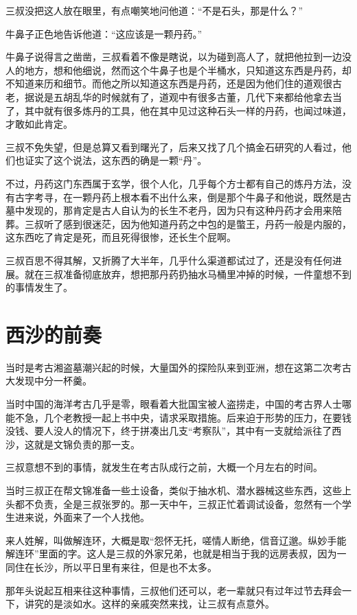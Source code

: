 三叔没把这人放在眼里，有点嘲笑地问他道：“不是石头，那是什么？”

牛鼻子正色地告诉他道：“这应该是一颗丹药。”

牛鼻子说得言之凿凿，三叔看着不像是瞎说，以为碰到高人了，就把他拉到一边没人的地方，想和他细说，然而这个牛鼻子也是个半桶水，只知道这东西是丹药，却不知道来历和细节。而他之所以知道这东西是丹药，还是因为他们住的道观很古老，据说是五胡乱华的时候就有了，道观中有很多古董，几代下来都给他拿去当了，其中就有很多炼丹的工具，他在其中见过这种石头一样的丹药，也闻过味道，才敢如此肯定。

三叔不免失望，但是总算又看到曙光了，后来又找了几个搞金石研究的人看过，他们也证实了这个说法，这东西的确是一颗“丹”。

不过，丹药这门东西属于玄学，很个人化，几乎每个方士都有自己的炼丹方法，没有古字考寻，在一颗丹药上根本看不出什么来，倒是那个牛鼻子和他说，既然是古墓中发现的，那肯定是古人自认为的长生不老丹，因为只有这种丹药才会用来陪葬。三叔听了感到很迷茫，因为他知道丹药之中包的是蟞王，丹药一般是内服的，这东西吃了肯定是死，而且死得很惨，还长生个屁啊。

三叔百思不得其解，又折腾了大半年，几乎什么渠道都试过了，还是没有任何进展。就在三叔准备彻底放弃，想把那丹药扔抽水马桶里冲掉的时候，一件童想不到的事情发生了。

\chapter{西沙的前奏}

当时是考古湘盗墓潮兴起的时候，大量国外的探险队来到亚洲，想在这第二次考古大发现中分一杯羹。

当时中国的海洋考古几乎是零，眼看着大批国宝被人盗捞走，中国的考古界人士哪能不急，几个老教授一起上书中央，请求采取措施。后来迫于形势的压力，在要钱没钱、要人没人的情况下，终于拼凑出几支“考察队”，其中有一支就给派往了西沙，这就是文锦负责的那一支。

三叔意想不到的事情，就发生在考古队成行之前，大概一个月左右的时间。

当时三叔正在帮文锦准备一些土设备，类似于抽水机、潜水器械这些东西，这些上头都不负责，全是三叔张罗的。那一天中午，三叔正忙着调试设备，忽然有一个学生进来说，外面来了一个人找他。

来人姓解，叫做解连环，大概是取“怨怀无托，嗟情人断绝，信音辽邈。纵妙手能解连环”里面的字。这人是三叔的外家兄弟，也就是相当于我的远房表叔，因为一同住在长沙，所以平日里有来往，但是也不太多。

那年头说起互相来往这种事情，三叔他们还可以，老一辈就只有过年过节去拜会一下，讲究的是淡如水。这样的亲戚突然来找，让三叔有点意外。

